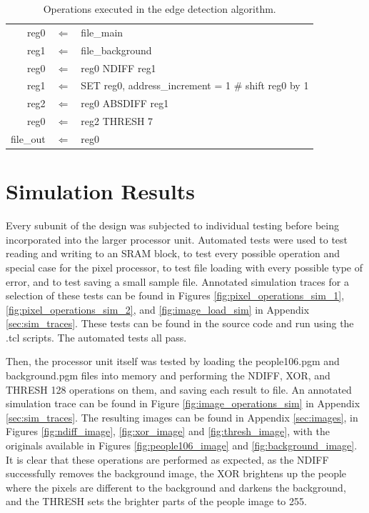 \documentclass[a4paper, 10pt, titlepage]{article}
\begin{document}
\begin{table}[htb]
    \centering
    \begin{tabular}[c]{ r c l }
        reg0&$\Leftarrow$&file\_main \\
        reg1&$\Leftarrow$&file\_background \\
        reg0&$\Leftarrow$&reg0 NDIFF reg1 \\
        reg1&$\Leftarrow$&SET reg0, address\_increment = 1 \# shift reg0 by 1 \\
        reg2&$\Leftarrow$&reg0 ABSDIFF reg1 \\
        reg0&$\Leftarrow$&reg2 THRESH 7 \\
        file\_out&$\Leftarrow$&reg0 \\
    \end{tabular}
    \caption{Operations executed in the edge detection algorithm.}
    \label{tab:edge_detect_ops}
\end{table}

\section{Simulation Results}

Every subunit of the design was subjected to individual testing before being incorporated into the larger processor unit. Automated tests were used to test reading and writing to an SRAM block, to test every possible operation and special case for the pixel processor, to test file loading with every possible type of error, and to test saving a small sample file. Annotated simulation traces for a selection of these tests can be found in Figures \ref{fig:pixel_operations_sim_1}, \ref{fig:pixel_operations_sim_2}, and \ref{fig:image_load_sim} in Appendix \ref{sec:sim_traces}. These tests can be found in the source code and run using the .tcl scripts. The automated tests all pass.

Then, the processor unit itself was tested by loading the people106.pgm and background.pgm files into memory and performing the NDIFF, XOR, and THRESH 128 operations on them, and saving each result to file. An annotated simulation trace can be found in Figure \ref{fig:image_operations_sim} in Appendix \ref{sec:sim_traces}. The resulting images can be found in Appendix \ref{sec:images}, in Figures \ref{fig:ndiff_image}, \ref{fig:xor_image} and \ref{fig:thresh_image}, with the originals available in Figures \ref{fig:people106_image} and \ref{fig:background_image}. It is clear that these operations are performed as expected, as the NDIFF successfully removes the background image, the XOR brightens up the people where the pixels are different to the background and darkens the background, and the THRESH sets the brighter parts of the people image to 255.
\end{document}
